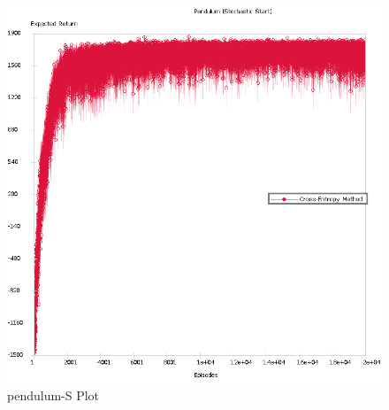 \documentclass{article}
\begin{document}
\begin{figure}
\includegraphics[scale=0.5]{Pendulum_Sto}
\caption{pendulum-S Plot}
\label{fig:pendulum-S}
\end{figure}
\end{document}
